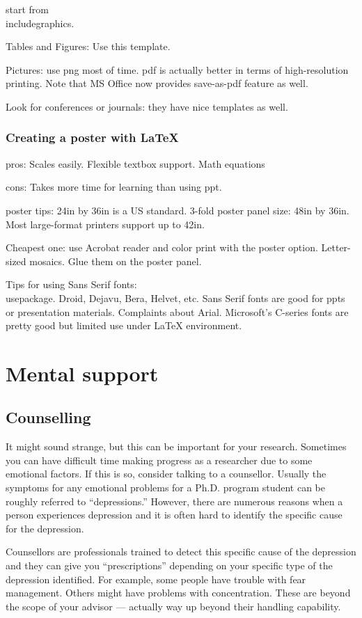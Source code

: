 \documentclass[11pt]{article}
\begin{document}
start from \\includegraphics.

Tables and Figures: Use this template.

Pictures: use png most of time. pdf is actually better in terms of
high-resolution printing. Note that MS Office now provides save-as-pdf feature
as well. 

Look for conferences or journals: they have nice templates as well.


\subsubsection{Creating a poster with LaTeX}

pros: Scales easily. Flexible textbox support. Math equations

cons: Takes more time for learning than using ppt. 

poster tips: 24in by 36in is a US standard. 3-fold poster panel size: 48in by
36in. Most large-format printers support up to 42in.

Cheapest one: use Acrobat reader and color print with the poster option.
Letter-sized mosaics. Glue them on the poster panel. 

Tips for using Sans Serif fonts: \\usepackage. Droid, Dejavu, Bera, Helvet,
etc. Sans Serif fonts are good for ppts or presentation materials. Complaints
about Arial. Microsoft's C-series fonts are pretty good but limited use under
LaTeX environment.



\section{Mental support}

\subsection{Counselling}
It might sound strange, but this can be important for your research.
Sometimes you can have difficult time making progress as a researcher due to
some emotional factors. If this is so, consider talking to a counsellor.
Usually the symptoms for any emotional problems for a Ph.D.  program student
can be roughly referred to ``depressions.'' However, there are numerous
reasons when a person experiences depression and it is often hard to identify
the specific cause for the depression.

Counsellors are professionals trained to detect this specific cause of the
depression and they can give you ``prescriptions'' depending on your specific
type of the depression identified. For example, some people have trouble with
fear management. Others might have problems with concentration. These are
beyond the scope of your advisor --- actually way up beyond their handling
capability.
\end{document}
